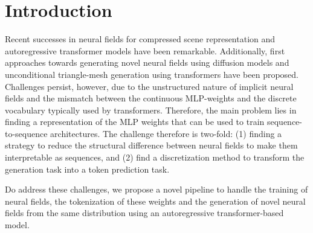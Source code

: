 \section{Introduction}
\label{sec:intro}

Recent successes in neural fields for compressed scene representation and autoregressive transformer models have been remarkable.
Additionally, first approaches towards generating novel neural fields using diffusion models \cite{erkoç2023hyperdiffusion} and unconditional triangle-mesh generation using transformers \cite{siddiqui2023meshgpt} have been proposed.
Challenges persist, however, due to the unstructured nature of implicit neural fields and the mismatch between the continuous MLP-weights and the discrete vocabulary typically used by transformers.
Therefore, the main problem lies in finding a representation of the MLP weights that can be used to train sequence-to-sequence architectures.
The challenge therefore is two-fold: (1) finding a strategy to reduce the structural difference between neural fields to make them interpretable as sequences, and (2) find a discretization method to transform the generation task into a token prediction task.

Do address these challenges, we propose a novel pipeline to handle the training of neural fields, the tokenization of these weights and the generation of novel neural fields from the same distribution using an autoregressive transformer-based model.



